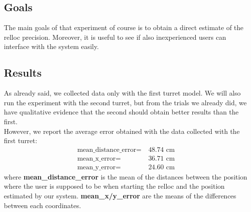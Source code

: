 \subsection{Goals}
The main goals of that experiment of course is to obtain a direct estimate of the relloc precision. Moreover, it is useful to see if also inexperienced users can interface with the system easily.

\subsection{Results}
As already said, we collected data only with the first turret model. We will also run the experiment with the second turret, but from the trials we already did, we have qualitative evidence that the second should obtain better results than the first. \\
However, we report the average error obtained with the data collected with the first turret:
\begin{align}
    \text{mean\_distance\_error} =&\ 48.74\text{ cm} \nonumber\\
    \text{mean\_x\_error} =&\ 36.71\text{ cm}\nonumber\\
    \text{mean\_y\_error} =&\ 24.60\text{ cm}\nonumber
\end{align}
where \textbf{mean\_distance\_error} is the mean of the distances between the position where the user is supposed to be when starting the relloc and the position estimated by our system. \textbf{mean\_x/y\_error} are the means of the differences between each coordinates.